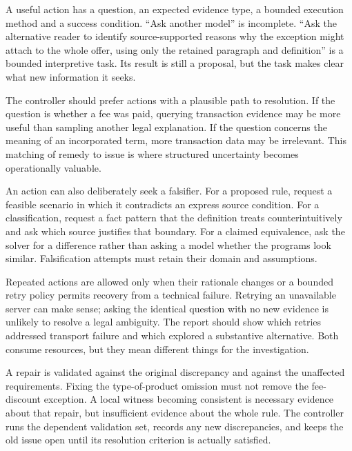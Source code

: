 A useful action has a question, an expected evidence type, a bounded execution
method and a success condition. ``Ask another model'' is incomplete. ``Ask the
alternative reader to identify source-supported reasons why the exception might
attach to the whole offer, using only the retained paragraph and definition'' is
a bounded interpretive task. Its result is still a proposal, but the task makes
clear what new information it seeks.

The controller should prefer actions with a plausible path to resolution. If the
question is whether a fee was paid, querying transaction evidence may be more
useful than sampling another legal explanation. If the question concerns the
meaning of an incorporated term, more transaction data may be irrelevant. This
matching of remedy to issue is where structured uncertainty becomes operationally
valuable.


An action can also deliberately seek a falsifier. For a proposed rule, request a
feasible scenario in which it contradicts an express source condition. For a
classification, request a fact pattern that the definition treats counterintuitively
and ask which source justifies that boundary. For a claimed equivalence, ask the
solver for a difference rather than asking a model whether the programs look
similar. Falsification attempts must retain their domain and assumptions.

Repeated actions are allowed only when their rationale changes or a bounded retry
policy permits recovery from a technical failure. Retrying an unavailable server
can make sense; asking the identical question with no new evidence is unlikely
to resolve a legal ambiguity. The report should show which retries addressed
transport failure and which explored a substantive alternative. Both consume
resources, but they mean different things for the investigation.

A repair is validated against the original discrepancy and against the unaffected
requirements. Fixing the type-of-product omission must not remove the fee-discount
exception. A local witness becoming consistent is necessary evidence about that
repair, but insufficient evidence about the whole rule. The controller runs the
dependent validation set, records any new discrepancies, and keeps the old issue
open until its resolution criterion is actually satisfied.

